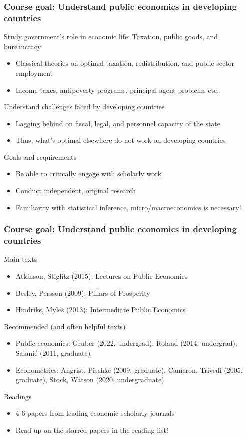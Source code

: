 \documentclass[aspectratio=169]{beamer}
\begin{document}
\begin{frame}
\frametitle{Course goal: Understand public economics in developing countries} 
Study government's role in economic life: Taxation, public goods, and bureaucracy
\begin{itemize}\setlength\itemsep{3pt}
\item Classical theories on optimal taxation,  redistribution, and public sector employment
\item Income taxes, antipoverty programs, principal-agent problems etc.
\end{itemize}\medskip

 Understand challenges faced by developing countries
\begin{itemize}\setlength\itemsep{3pt}
\item Lagging behind on fiscal, legal, and personnel capacity of the state  
  \item Thus, what's optimal elsewhere do not work on developing countries
\end{itemize}\medskip 

Goals and requirements
\begin{itemize}\setlength\itemsep{3pt}
\item Be able to critically engage with scholarly work
\item Conduct independent, original research
\item Familiarity with statistical inference, micro/macroeconomics is necessary!
\end{itemize}
\end{frame}


\begin{frame}
\frametitle{Course goal: Understand public economics in developing countries} 
Main texts
\begin{itemize}\setlength\itemsep{3pt}
\item Atkinson, Stiglitz (2015): Lectures on Public Economics
\item Besley, Persson (2009): Pillars of Prosperity
\item Hindriks, Myles (2013): Intermediate Public Economics
\end{itemize}\medskip

 Recommended (and often helpful texts)
\begin{itemize}\setlength\itemsep{3pt}
\item Public economics: Gruber (2022, undergrad), Roland (2014, undergrad), Salanié (2011, graduate)
\item Econometrics: Angrist, Pischke (2009, graduate), Cameron, Trivedi (2005, graduate), Stock, Watson (2020, undergraduate)
\end{itemize}\medskip 

Readings
\begin{itemize}\setlength\itemsep{3pt}
\item 4-6 papers from leading economic scholarly journals
\item Read up on the starred papers in the reading list!
\end{itemize}
\end{frame}
\end{document}
